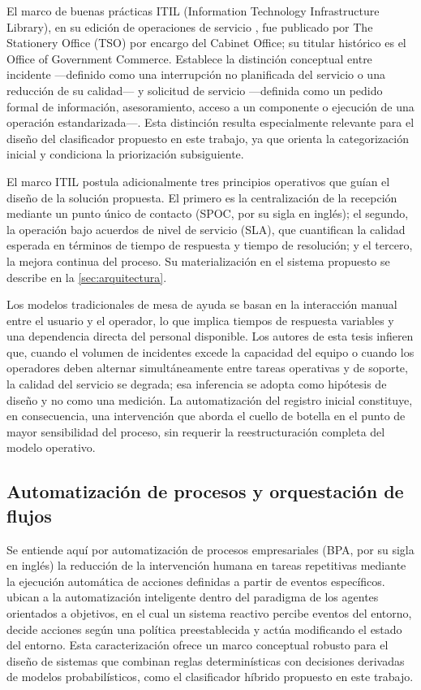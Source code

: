 El marco de buenas prácticas ITIL (Information Technology Infrastructure Library), en su edición de operaciones de servicio \parencite{OGC2011_itil}, fue publicado por The Stationery Office (TSO) por encargo del Cabinet Office; su titular histórico es el Office of Government Commerce. Establece la distinción conceptual entre incidente ---definido como una interrupción no planificada del servicio o una reducción de su calidad--- y solicitud de servicio ---definida como un pedido formal de información, asesoramiento, acceso a un componente o ejecución de una operación estandarizada---. Esta distinción resulta especialmente relevante para el diseño del clasificador propuesto en este trabajo, ya que orienta la categorización inicial y condiciona la priorización subsiguiente.

El marco ITIL postula adicionalmente tres principios operativos que guían el diseño de la solución propuesta. El primero es la centralización de la recepción mediante un punto único de contacto (SPOC, por su sigla en inglés); el segundo, la operación bajo acuerdos de nivel de servicio (SLA), que cuantifican la calidad esperada en términos de tiempo de respuesta y tiempo de resolución; y el tercero, la mejora continua del proceso. Su materialización en el sistema propuesto se describe en la \autoref{sec:arquitectura}.

Los modelos tradicionales de mesa de ayuda se basan en la interacción manual entre el usuario y el operador, lo que implica tiempos de respuesta variables y una dependencia directa del personal disponible. Los autores de esta tesis infieren que, cuando el volumen de incidentes excede la capacidad del equipo o cuando los operadores deben alternar simultáneamente entre tareas operativas y de soporte, la calidad del servicio se degrada; esa inferencia se adopta como hipótesis de diseño y no como una medición. La automatización del registro inicial constituye, en consecuencia, una intervención que aborda el cuello de botella en el punto de mayor sensibilidad del proceso, sin requerir la reestructuración completa del modelo operativo.

\subsection{Automatización de procesos y orquestación de flujos}\label{subsec:automatizacion-orquestacion}

Se entiende aquí por automatización de procesos empresariales (BPA, por su sigla en inglés) la reducción de la intervención humana en tareas repetitivas mediante la ejecución automática de acciones definidas a partir de eventos específicos. \textcite{Russell2021_ai_modern} ubican a la automatización inteligente dentro del paradigma de los agentes orientados a objetivos, en el cual un sistema reactivo percibe eventos del entorno, decide acciones según una política preestablecida y actúa modificando el estado del entorno. Esta caracterización ofrece un marco conceptual robusto para el diseño de sistemas que combinan reglas determinísticas con decisiones derivadas de modelos probabilísticos, como el clasificador híbrido propuesto en este trabajo.

